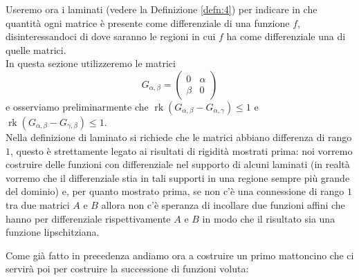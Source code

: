 \documentclass[a4paper,11pt]{book}
\theoremstyle{plain}
\theoremstyle{definition}
\theoremstyle{remark}
\DeclareMathOperator{\rk}{rk}
\begin{document}
Useremo ora i laminati (vedere la Definizione \ref{defn:4}) per indicare in che quantità ogni matrice è presente come differenziale di una funzione $f$, disinteressandoci di dove saranno le regioni in cui $f$ ha come differenziale una di quelle matrici.\\
In questa sezione utilizzeremo le matrici
\[
	G_{\alpha,\beta}=\begin{pmatrix}
	                 	0 &\alpha\\
	                 	\beta&0
	                 \end{pmatrix}
\]
e osserviamo preliminarmente che $\rk(G_{\alpha,\beta}-G_{\alpha,\gamma})\leq 1$ e $\rk(G_{\alpha,\beta}-G_{\gamma,\beta}) \leq 1$.\\
Nella definizione di laminato si richiede che le matrici abbiano differenza di rango $1$, questo è strettamente legato ai risultati di rigidità mostrati prima: noi vorremo costruire delle funzioni con differenziale nel supporto di alcuni laminati (in realtà vorremo che il differenziale stia in tali supporti in una regione sempre più grande del dominio) e, per quanto mostrato prima, se non c'è una connessione di rango $1$ tra due matrici $A$ e $B$ allora non c'è speranza di incollare due funzioni affini che hanno per differenziale rispettivamente $A$ e $B$ in modo che il risultato sia una funzione lipschitziana.

Come già fatto in precedenza andiamo ora a costruire un primo mattoncino che ci servirà poi per costruire la successione di funzioni voluta:
\end{document}
